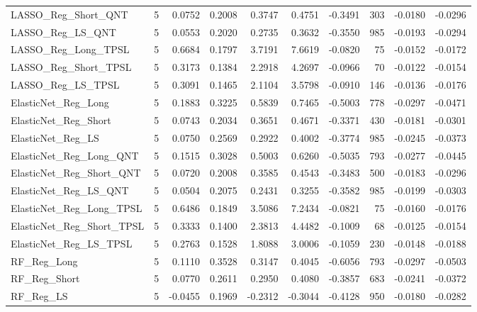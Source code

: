 \begin{tabular}{llrrrrrrrr}
\cline{1-10}
LASSO\_Reg\_Short\_QNT & 5 & 0.0752 & 0.2008 & 0.3747 & 0.4751 & -0.3491 & 303 & -0.0180 & -0.0296 \\
\cline{1-10}
LASSO\_Reg\_LS\_QNT & 5 & 0.0553 & 0.2020 & 0.2735 & 0.3632 & -0.3550 & 985 & -0.0193 & -0.0294 \\
\cline{1-10}
LASSO\_Reg\_Long\_TPSL & 5 & 0.6684 & 0.1797 & 3.7191 & 7.6619 & -0.0820 & 75 & -0.0152 & -0.0172 \\
\cline{1-10}
LASSO\_Reg\_Short\_TPSL & 5 & 0.3173 & 0.1384 & 2.2918 & 4.2697 & -0.0966 & 70 & -0.0122 & -0.0154 \\
\cline{1-10}
LASSO\_Reg\_LS\_TPSL & 5 & 0.3091 & 0.1465 & 2.1104 & 3.5798 & -0.0910 & 146 & -0.0136 & -0.0176 \\
\cline{1-10}
ElasticNet\_Reg\_Long & 5 & 0.1883 & 0.3225 & 0.5839 & 0.7465 & -0.5003 & 778 & -0.0297 & -0.0471 \\
\cline{1-10}
ElasticNet\_Reg\_Short & 5 & 0.0743 & 0.2034 & 0.3651 & 0.4671 & -0.3371 & 430 & -0.0181 & -0.0301 \\
\cline{1-10}
ElasticNet\_Reg\_LS & 5 & 0.0750 & 0.2569 & 0.2922 & 0.4002 & -0.3774 & 985 & -0.0245 & -0.0373 \\
\cline{1-10}
ElasticNet\_Reg\_Long\_QNT & 5 & 0.1515 & 0.3028 & 0.5003 & 0.6260 & -0.5035 & 793 & -0.0277 & -0.0445 \\
\cline{1-10}
ElasticNet\_Reg\_Short\_QNT & 5 & 0.0720 & 0.2008 & 0.3585 & 0.4543 & -0.3483 & 500 & -0.0183 & -0.0296 \\
\cline{1-10}
ElasticNet\_Reg\_LS\_QNT & 5 & 0.0504 & 0.2075 & 0.2431 & 0.3255 & -0.3582 & 985 & -0.0199 & -0.0303 \\
\cline{1-10}
ElasticNet\_Reg\_Long\_TPSL & 5 & 0.6486 & 0.1849 & 3.5086 & 7.2434 & -0.0821 & 75 & -0.0160 & -0.0176 \\
\cline{1-10}
ElasticNet\_Reg\_Short\_TPSL & 5 & 0.3333 & 0.1400 & 2.3813 & 4.4482 & -0.1009 & 68 & -0.0125 & -0.0154 \\
\cline{1-10}
ElasticNet\_Reg\_LS\_TPSL & 5 & 0.2763 & 0.1528 & 1.8088 & 3.0006 & -0.1059 & 230 & -0.0148 & -0.0188 \\
\cline{1-10}
RF\_Reg\_Long & 5 & 0.1110 & 0.3528 & 0.3147 & 0.4045 & -0.6056 & 793 & -0.0297 & -0.0503 \\
\cline{1-10}
RF\_Reg\_Short & 5 & 0.0770 & 0.2611 & 0.2950 & 0.4080 & -0.3857 & 683 & -0.0241 & -0.0372 \\
\cline{1-10}
RF\_Reg\_LS & 5 & -0.0455 & 0.1969 & -0.2312 & -0.3044 & -0.4128 & 950 & -0.0180 & -0.0282 \\

\end{tabular}
